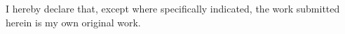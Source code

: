 
\begin{declaration}

I hereby declare that, except where specifically indicated, the work submitted herein is my own original work.


\end{declaration}

